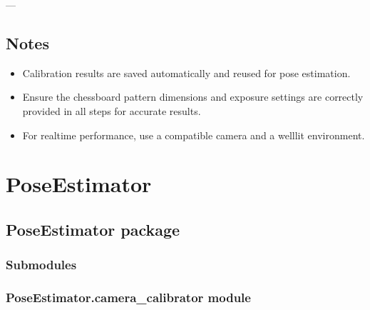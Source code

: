 \documentclass[letterpaper,10pt,english]{sphinxmanual}
\begin{document}
\sphinxAtStartPar
—


\section{Notes}
\label{\detokenize{introduction:notes}}\begin{itemize}
\item {} 
\sphinxAtStartPar
Calibration results are saved automatically and reused for pose estimation.

\item {} 
\sphinxAtStartPar
Ensure the chessboard pattern dimensions and exposure settings are correctly provided in all steps for accurate results.

\item {} 
\sphinxAtStartPar
For real\sphinxhyphen{}time performance, use a compatible camera and a well\sphinxhyphen{}lit environment.

\end{itemize}

\sphinxstepscope


\chapter{PoseEstimator}
\label{\detokenize{modules:poseestimator}}\label{\detokenize{modules::doc}}
\sphinxstepscope


\section{PoseEstimator package}
\label{\detokenize{PoseEstimator:poseestimator-package}}\label{\detokenize{PoseEstimator::doc}}

\subsection{Submodules}
\label{\detokenize{PoseEstimator:submodules}}

\subsection{PoseEstimator.camera\_calibrator module}
\label{\detokenize{PoseEstimator:module-PoseEstimator.camera_calibrator}}\label{\detokenize{PoseEstimator:poseestimator-camera-calibrator-module}}
\end{document}
